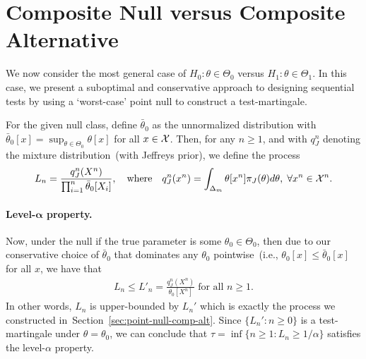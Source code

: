 \documentclass[12pt]{article}
\begin{document}
\section{Composite Null versus Composite Alternative}
\label{sec:comp-null-comp-alt}
We now consider the most general case of $H_0: \theta \in \Theta_0$ versus $H_1: \theta \in \Theta_1$. In this case, we present a suboptimal and conservative approach to designing sequential tests by using a `worst-case' point null to construct a test-martingale. 

For the given null class, define $\bar{\theta}_0$ as the unnormalized distribution with $\bar{\theta}_0[x] = \sup_{\theta \in \Theta_0} \theta[x]$ for all $x \in {\cal X}$. Then, for any $n \geq 1$, and with $q_J^n$ denoting the mixture distribution~(with Jeffreys prior), we define the process 
\begin{align}
    L_n = \frac{q_J^n(X^n)}{\prod_{i=1}^n \bar{\theta}_0[X_i]}, \quad \text{where} \quad q_J^n(x^n) = \int_{\Delta_m} \theta[x^n] \pi_J(\theta) d\theta, \; \forall x^n \in {\cal X}^n. 
\end{align}
\paragraph{Level-$\mathbf{\alpha}$ property.} Now, under the null if the true parameter is some $\theta_0 \in \Theta_0$, then due to our conservative choice of $\bar{\theta}_0$ that dominates any $\theta_0$ pointwise~(i.e., $\theta_0[x] \leq \bar{\theta}_0[x]$ for all $x$, we have that 
\begin{align}
    L_n \leq L'_n = \frac{q_J^n(X^n)}{\theta_0[X^n]}\; \text{for all } n \geq 1. 
\end{align}
In other words, $L_n$ is upper-bounded  by $L_n'$ which is exactly the process we constructed in~Section~\ref{sec:point-null-comp-alt}. Since $\{L_n': n \geq 0\}$  is a test-martingale under $\theta=\theta_0$, we can conclude that $\tau = \inf \{n \geq 1: L_n \geq 1/\alpha\}$ satisfies the level-$\alpha$ property. 
\end{document}
